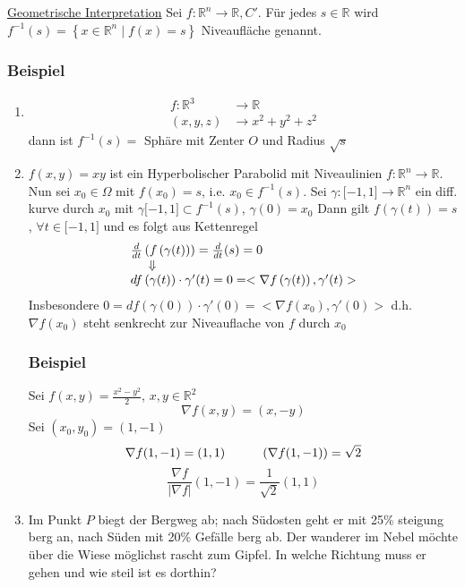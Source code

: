\noindent \underline{Geometrische Interpretation}
Sei $f:\mathbb{R}^n\rightarrow\mathbb{R}, C'$. Für jedes $s\in\mathbb{R}$ wird $f^{-1}(s)=\left\{ x\in\mathbb{R}^n\mid f(x)=s\right\}$ Niveaufläche genannt.

\subsubsection*{Beispiel}
\begin{enumerate}
    \item \begin{align*}
 f:\mathbb{R}^3 &\rightarrow\mathbb{R}\\
 \left( x,y,z\right) &\rightarrow x^2 +y^2 +z^2
 \end{align*}
dann ist $f^{-1}(s)=$ Sphäre mit Zenter $O$ und Radius $\sqrt{s}$
\item $f\left( x,y\right) = xy$ ist ein Hyperbolischer Parabolid mit Niveaulinien  $f:\mathbb{R}^n \rightarrow\mathbb{R}$. Nun sei $x_0\in\Omega$ mit $f\left( x_0\right) = s$, i.e. $x_0 \in f^{-1} (s)$. Sei $\gamma :\lbrack -1,1\rbrack\rightarrow \mathbb{R}^n$ ein diff. kurve durch $x_0$ mit $\gamma\lbrack -1,1\rbrack\subset f^{-1}(s)$, $\gamma (0)=x_0$
Dann gilt $f\left( \gamma (t)\right)=s$, $\forall t\in\lbrack -1,1\rbrack$ und es folgt aus Kettenregel
\[\begin{array}{l}%
\frac{d}{{dt}}\left( {f\left( {\gamma (t)} \right)} \right) = \frac{d}{{dt}}(s) = 0\\
\hspace{5mm} \Downarrow \\
df\left( {\gamma (t)} \right) \cdot \gamma '(t) = 0 =  < \nabla f\left( {\gamma (t)} \right),\gamma '(t) > 
\end{array}\]
Insbesondere $0=df\left(\gamma (0)\right)\cdot\gamma'(0)= < \nabla f\left( x_0\right),\gamma'(0) >$ d.h. $\nabla f\left( x_0\right)$ steht senkrecht zur Niveauflache von $f$ durch $x_0$
\subsubsection*{Beispiel}
Sei $f(x,y)=\frac{x^2-y^2}{2}$, $x,y\in\mathbb{R}^2$ $$\nabla f(x,y)=(x,-y)$$ Sei $\left( x_0,y_0\right) = (1,-1)$ $$\nabla f(1,-1)=(1,1)\hspace{10mm} \left( \nabla f(1,-1)\right) = \sqrt{2}$$ $$\frac{\nabla f}{\left| \nabla f\right|}(1,-1)=\frac{1}{\sqrt{2}}(1,1)$$
\item Im Punkt $P$ biegt der Bergweg ab; nach Südosten geht er mit 25\% steigung berg an, nach Süden mit 20\% Gefälle berg ab. Der wanderer im Nebel möchte über die Wiese möglichst rascht zum Gipfel. In welche Richtung muss er gehen und wie steil ist es dorthin?\\


\end{enumerate}

